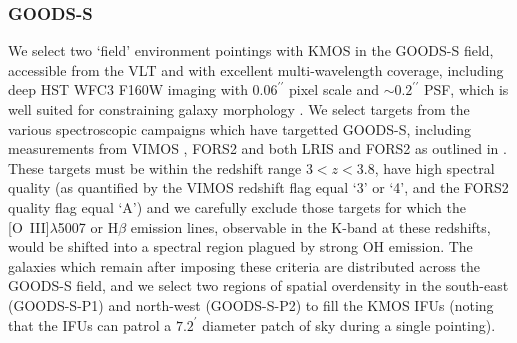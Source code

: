 \documentclass[fleqn,usenatbib]{mn2e}
\begin{document}
\subsubsection{GOODS-S}\label{subsubsec:sample_selection_goods}
We select two `field' environment pointings with KMOS in the GOODS-S field, accessible from the VLT and with excellent multi-wavelength coverage, including deep HST WFC3 F160W imaging with $ 0.06^{\prime\prime}$ pixel scale and $ \sim 0.2^{\prime\prime}$ PSF, which is well suited for constraining galaxy morphology \citep{Grogin2011,Koekemoer2011}.
We select targets from the various spectroscopic campaigns which have targetted GOODS-S, including measurements from VIMOS \citep{Balestra2010,Cassata2014}, FORS2 \citep{Vanzella2005,Vanzella2006,Vanzella2008} and both LRIS and FORS2 as outlined in \cite{Wuyts2009}.
These targets must be within the redshift range $3 < z < 3.8$, have high spectral quality (as quantified by the VIMOS redshift flag equal `3' or `4', and the FORS2 quality flag equal `A') and we carefully exclude those targets for which the [O~{\sc III}]$\lambda$5007 or H$\beta$ emission lines, observable in the K-band at these redshifts, would be shifted into a spectral region plagued by strong OH emission.
The galaxies which remain after imposing these criteria are distributed across the GOODS-S field, and we select two regions of spatial overdensity in the south-east (GOODS-S-P1) and north-west (GOODS-S-P2) to fill the KMOS IFUs (noting that the IFUs can patrol a $7.2^{\prime}$ diameter patch of sky during a single pointing).
\end{document}
